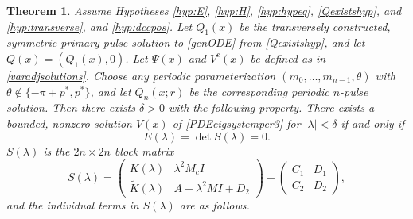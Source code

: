 \documentclass[10pt,reqno]{amsart}
\theoremstyle{plain}
\newtheorem{theorem}{Theorem}
\theoremstyle{definition}
\theoremstyle{remark}
\numberwithin{theorem}{section}
\numberwithin{equation}{section}
\begin{document}
\begin{theorem}\label{blockmatrixtheorem}
Assume Hypotheses \ref{hyp:E}, \ref{hyp:H}, \ref{hyp:hypeq}, \ref{Qexistshyp}, and \ref{hyp:transverse}, and \ref{hyp:dccpos}. Let $Q_1(x)$ be the transversely constructed, symmetric primary pulse solution to \eqref{genODE} from \cref{Qexistshyp}, and let $Q(x) = (Q_1(x), 0)$. Let $\Psi(x)$ and $V^c(x)$ be defined as in \cref{varadjsolutions}. Choose any periodic parameterization $(m_0, \dots, m_{n-1}, \theta)$ with $\theta \notin \{-\pi + p^*, p^* \}$, and let $Q_n(x; r)$ be the corresponding periodic $n$-pulse solution. Then there exists $\delta > 0$ with the following property. There exists a bounded, nonzero solution $V(x)$ of \cref{PDEeigsystemper3} for $|\lambda| < \delta$ if and only if
\begin{equation}\label{blockmatrixcond}
E(\lambda) = \det S(\lambda) = 0.
\end{equation}
$S(\lambda)$ is the $2n \times 2n$ block matrix
\begin{equation}\label{blockeq}
S(\lambda) = 
\begin{pmatrix}
K(\lambda) & \lambda^2 M_c I \\
\tilde{K}(\lambda) & A - \lambda^2 MI + D_2
\end{pmatrix} +
\begin{pmatrix}C_1 & D_1 \\ C_2 & D_2
\end{pmatrix},
\end{equation}
and the individual terms in $S(\lambda)$ are as follows.


\end{theorem}
\end{document}
